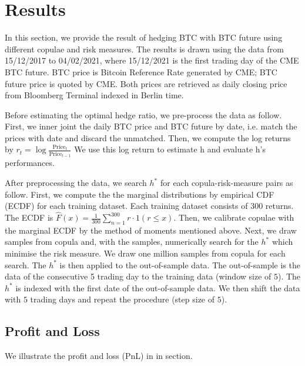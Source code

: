 \section{Results}\label{sec:results}
In this section, we provide the result of hedging BTC with BTC future using different copulae and risk measures.
The results is drawn using the data from 15/12/2017 to 04/02/2021, where 15/12/2021 is the first trading day of the CME BTC future.
BTC price is Bitcoin Reference Rate generated by CME; BTC future price is quoted by CME.
Both prices are retrieved as daily closing price from Bloomberg Terminal indexed in Berlin time.
\medskip

Before estimating the optimal hedge ratio, we pre-process the data as follow.
First, we inner joint the daily BTC price and BTC future by date,
i.e. match the prices with date and discard the unmatched.
Then, we compute the log returns by $r_t = \log \frac{\text{Price}_t}{\text{Price}_{t-1}}$
We use this log return to estimate h and evaluate h’s performances. \medskip

After preprocessing the data, we search $h^*$ for each copula-risk-measure pairs as follow.
First, we compute the the marginal distributions by empirical CDF (ECDF) for each training dataset.
Each training dataset consists of 300 returns.
The ECDF is $\hat F(x) = \frac{1}{300}\sum_{n=1}^{300} r \cdot 1(r \leq x)$.
Then, we calibrate copulae with the marginal ECDF by the method of moments mentioned above.
Next, we draw samples from copula and, with the samples, numerically search for the $h^*$ which minimise the risk measure.
We draw one million samples from copula for each search.
The $h^*$ is then applied to the out-of-sample data.
The out-of-sample is the data of the consecutive 5 trading day to the training data (window size of $5$).
The $h^*$ is indexed with the first date of the out-of-sample data.
We then shift the data with $5$ trading days and repeat the procedure (step size of $5$). \medskip

\subsection{Profit and Loss}\label{subsec:empirical-results}
We illustrate the profit and loss (PnL) in in section.


